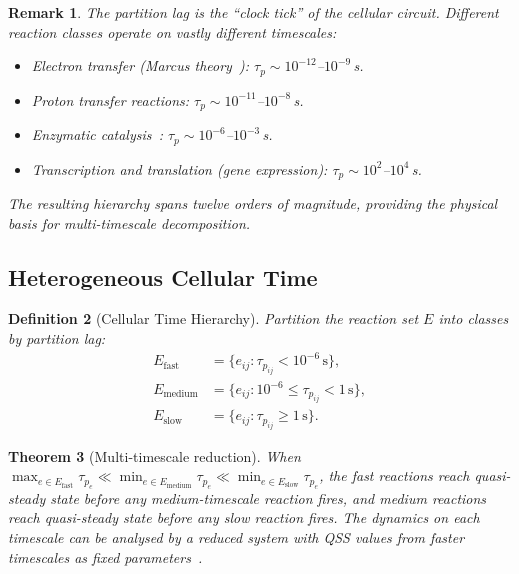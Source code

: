\documentclass[twocolumn,10pt,a4paper]{article}
\newcommand{\taup}{\tau_p}
\newtheorem{theorem}{Theorem}[section]
\newtheorem{definition}[theorem]{Definition}
\newtheorem{remark}[theorem]{Remark}
\begin{document}
\begin{remark}
The partition lag is the ``clock tick'' of the cellular circuit.  Different
reaction classes operate on vastly different timescales:
\begin{itemize}[noitemsep]
  \item Electron transfer (Marcus theory~\cite{Marcus1956}):
        $\taup\sim 10^{-12}$--$10^{-9}$\,s.
  \item Proton transfer reactions:
        $\taup\sim 10^{-11}$--$10^{-8}$\,s.
  \item Enzymatic catalysis~\cite{Wolfenden2001,MichaelisMenten1913}:
        $\taup\sim 10^{-6}$--$10^{-3}$\,s.
  \item Transcription and translation (gene expression):
        $\taup\sim 10^2$--$10^4$\,s.
\end{itemize}
The resulting hierarchy spans twelve orders of magnitude, providing the
physical basis for multi-timescale decomposition.
\end{remark}

\subsection{Heterogeneous Cellular Time}
\label{sec:time-hetero}

\begin{definition}[Cellular Time Hierarchy]
\label{def:time-hierarchy}
Partition the reaction set $E$ into classes by partition lag:
\begin{align*}
  E_{\mathrm{fast}}   &= \{e_{ij}:\taup_{ij}<10^{-6}\,\text{s}\},\\
  E_{\mathrm{medium}} &= \{e_{ij}:10^{-6}\leq\taup_{ij}<1\,\text{s}\},\\
  E_{\mathrm{slow}}   &= \{e_{ij}:\taup_{ij}\geq 1\,\text{s}\}.
\end{align*}
\end{definition}

\begin{theorem}[Multi-timescale reduction]
\label{thm:timescale}
When $\max_{e\in E_{\mathrm{fast}}}\taup_e\ll\min_{e\in E_{\mathrm{medium}}}\taup_e\ll
\min_{e\in E_{\mathrm{slow}}}\taup_e$, the fast reactions reach quasi-steady
state before any medium-timescale reaction fires, and medium reactions reach
quasi-steady state before any slow reaction fires.  The dynamics on each
timescale can be analysed by a reduced system with QSS values from faster
timescales as fixed parameters~\cite{Murray2002,HeinrichSchuster1996}.
\end{theorem}
\end{document}
